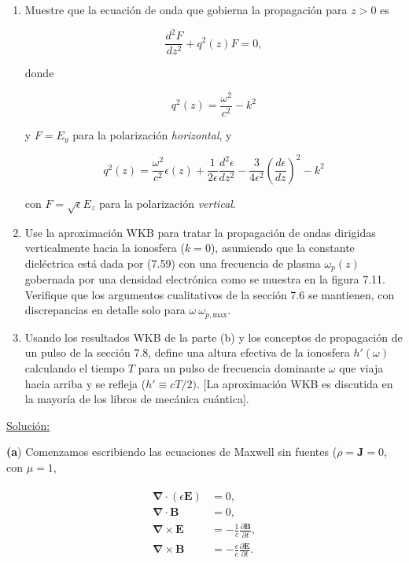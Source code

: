 \documentclass[a4paper,11pt]{article}
\numberwithin{equation}{section}
\begin{document}
\begin{enumerate}[label=\textbf{(\alph*)}]
 \item Muestre que la ecuación de onda que gobierna la propagación para $z > 0$ 
 es 
 
 $$
 \frac{d^2 F}{dz^2} + q^2(z) F = 0,
 $$
 
 donde 
 
 $$
 q^2(z) = \frac{\omega^2}{c^2}  - k^2
 $$
 
 y $F = E_y$ para la polarización \emph{horizontal}, y 
 
 $$
 q^2(z) =\frac{\omega^2}{c^2} \epsilon(z) + \frac{1}{2\epsilon}\frac{d^2 \epsilon}{dz^2} 
 - \frac{3}{4\epsilon^2}\left(\frac{d \epsilon}{d z} \right)^2 - k^2
 $$
 
 con $F = \sqrt{\epsilon}E_z$ para la polarización \emph{vertical}.
 
 \item Use la aproximación WKB para tratar la propagación de ondas dirigidas 
 verticalmente hacia la ionosfera ($k = 0$), asumiendo que la constante dieléctrica 
 está dada por (7.59) con una frecuencia de plasma $\omega_p(z)$ gobernada por una 
 densidad electrónica como se muestra en la figura 7.11. Verifique que los argumentos 
 cualitativos de la sección 7.6 se mantienen, con discrepancias en detalle solo 
 para $\omega ~ \omega_{p,\text{max}}$.
 
 \item Usando los resultados WKB de la parte (b) y los conceptos de propagación 
 de un pulso de la sección 7.8, define una altura efectiva de la ionosfera $h'(\omega)$ 
 calculando el tiempo $T$ para un pulso de frecuencia dominante $\omega$ que viaja 
 hacia arriba y se refleja ($h' \equiv cT/2)$. [La aproximación WKB es discutida 
 en la mayoría de los libros de mecánica cuántica].
\end{enumerate}

\vspace{.3cm}

\underline{Solución:} \vspace{.3cm}

\textbf{(a}) Comenzamos escribiendo las ecuaciones de Maxwell sin fuentes ($\rho = 
\mathbf{J} = 0$, con $\mu = 1$, 

\begin{align}
 \begin{split}
  \pmb{\nabla} \cdot (\epsilon \mathbf{E}) &= 0, \\
  \pmb{\nabla} \cdot \mathbf{B} &= 0, \\
  \pmb{\nabla} \times \mathbf{E} &= - \frac{1}{c} \frac{\partial \mathbf{B}}
  {\partial t}, \\
  \pmb{\nabla} \times \mathbf{B} &= - \frac{\epsilon}{c} \frac{\partial \mathbf{E}}
  {\partial t}.
 \end{split}
\end{align}
\end{document}
